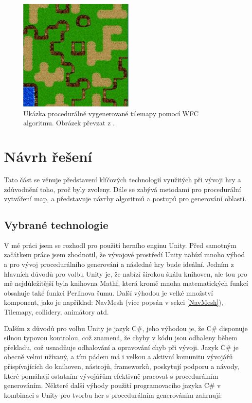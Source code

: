 \begin{figure}[H]
	\centering
	\includegraphics[scale=1]{obrazky-figures/WFCGenerated.png}
	\caption{Ukázka procedurálně vygenerované tilemapy pomocí WFC algoritmu. Obrázek převzat z \cite{cheng2020automatic}.}
	\label{WFCMap}
\end{figure}

\chapter{Návrh řešení}
\label{solution}
Tato část se věnuje představení klíčových technologií využitých při vývoji hry a zdůvodnění toho, proč byly zvoleny. Dále se zabývá metodami pro procedurální vytváření map, a představuje návrhy algoritmů a postupů pro generování oblastí.

\section{Vybrané technologie}
V mé práci jsem se rozhodl pro použití herního enginu Unity. Před samotným začátkem práce jsem zhodnotil, že vývojové prostředí Unity nabízí mnoho výhod a pro vývoj procedurálního generování a následné hry bude ideální. Jedním z hlavních důvodů pro volbu Unity je, že nabízí širokou škálu knihoven, ale tou pro mě nejdůležitější byla knihovna Mathf, která kromě mnoha matematických funkcí obsahuje také funkci Perlinova šumu. Další výhodou je velké množství komponent, jako je například: NavMesh (více popsán v sekci \ref{NavMesh}), Tilemapy, collidery, animátory atd.

Dalším z důvodů pro volbu Unity je jazyk C\#, jeho výhodou je, že C\# disponuje silnou typovou kontrolou, což znamená, že chyby v kódu jsou odhaleny během překladu, což usnadňuje odhalování a opravování chyb při vývoji. Jazyk C\# je obecně velmi užívaný, a tím pádem má i velkou a aktivní komunitu vývojářů přispívajících do knihoven, nástrojů, frameworků, poskytují podporu a návody, které pomáhají ostatním vývojářům efektivně pracovat s procedurálním generováním. Některé další výhody použití programovacího jazyka C\# v kombinaci s Unity pro tvorbu her s procedurálním generováním zahrnují:

